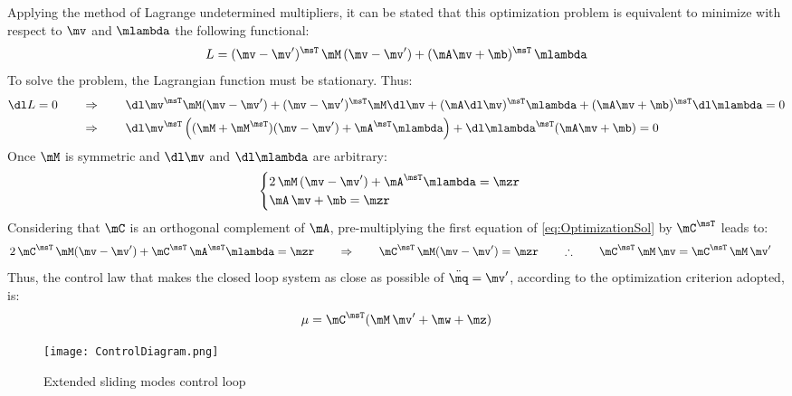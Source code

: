 Applying the method of Lagrange undetermined multipliers, it can be stated that this
optimization problem is equivalent to minimize with respect to $\mv$ and $\mlambda$
the following functional:
\begin{equation}
L = (\mv - \mv')^\msT \, \mM \, (\mv - \mv') + (\mA \mv + \mb)^\msT \, \mlambda 
\end{equation}
To solve the problem, the Lagrangian function must be stationary. Thus:
\begin{align}
 	\dl L = 0 \qquad &\Rightarrow \qquad  
 	\dl \mv^\msT \mM (\mv - \mv') + (\mv - \mv')^\msT \mM \dl \mv + (\mA \dl \mv)^\msT \mlambda 
		+ (\mA \mv + \mb)^\msT \dl \mlambda = 0 
	\nonumber \\	
& 	\Rightarrow \qquad
	\dl \mv^\msT \left( (\mM + \mM^\msT)(\mv - \mv') + \mA^\msT \mlambda \right) + \dl \mlambda^\msT (\mA \mv + \mb) = 0 
\end{align}
Once $\mM$ is symmetric and $\dl \mv$ and $\dl \mlambda$ are arbitrary:
\begin{equation} \label{eq:OptimizationSol}
\begin{cases}
2 \, \mM \, (\mv - \mv') + \mA^\msT \mlambda = \mzr \\
\mA \, \mv + \mb = \mzr
\end{cases}
\end{equation}
Considering that $\mC$ is an orthogonal complement of $\mA$, pre-multiplying the first equation of 
\eqref{eq:OptimizationSol} by $\mC^\msT$ leads to:
\begin{align}
& 	2 \, \mC^\msT \, \mM (\mv - \mv') + \mC^\msT \, \mA^\msT \mlambda = \mzr 
	\qquad 	\Rightarrow \qquad \mC^\msT \, \mM (\mv - \mv')  = \mzr 
	\qquad \therefore \qquad \mC^\msT \, \mM \, \mv  = \mC^\msT \, \mM \, \mv'
	\label{eq:OptimizationSol2}
\end{align}
Thus, the control law that makes the closed loop system as close as possible of $\ddot{\mq} = \mv'$, 
according to the optimization criterion adopted, is:
\begin{equation} \label{eq:ControlLawFinal}
\mu = \mC^\msT ( \mM \, \mv' + \mw + \mz )
\end{equation}

\begin{figure}[H]
	\centering
	\texttt{[image: ControlDiagram.png]}
	\caption{Extended sliding modes control loop}
	\label{ControlDiagram}
\end{figure}

